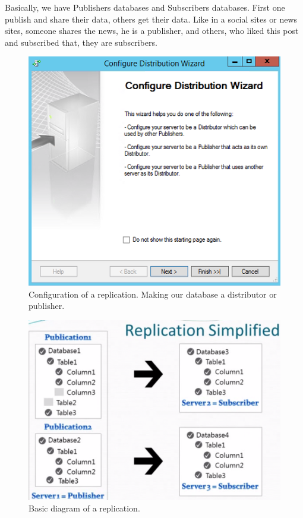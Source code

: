 \documentclass[english]{article}
\begin{document}
Basically, we have Publishers databases and Subscribers databases. First one publish and share their data, others get their data. Like in a social sites or news sites, someone shares the news, he is a publisher, and others, who liked this post and subscribed that, they are subscribers.
\begin{figure}[H]
\centerline{\includegraphics[scale=0.9]{administration/rep/2}}
\caption{Configuration of a replication. Making our database a distributor or publisher.}
\end{figure}

\begin{figure}[H]
\centerline{\includegraphics[scale=0.5]{administration/rep/3}}
\caption{Basic diagram of a replication.}
\end{figure}
\end{document}
